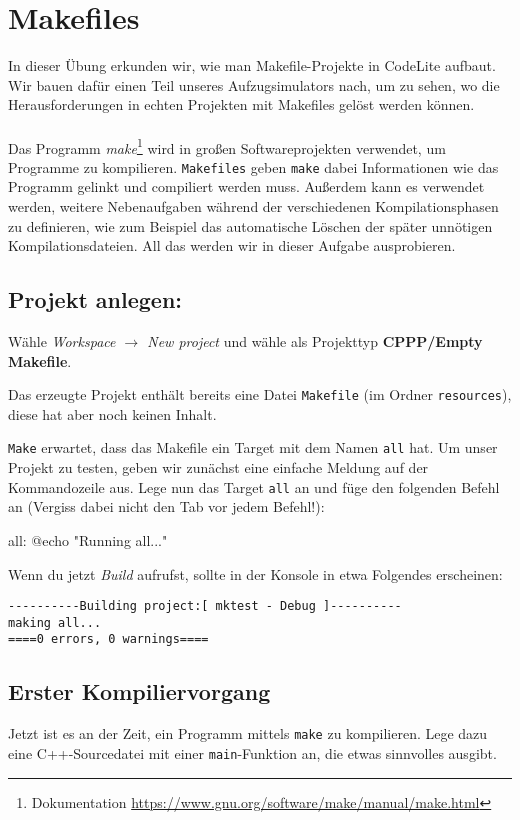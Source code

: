 \section{Makefiles}

In dieser Übung erkunden wir, wie man Makefile-Projekte in CodeLite aufbaut.
Wir bauen dafür einen Teil unseres Aufzugsimulators nach, um zu sehen, wo die Herausforderungen in echten Projekten mit Makefiles gelöst werden können. \\\\

Das Programm \emph{make}\footnote{Dokumentation \url{https://www.gnu.org/software/make/manual/make.html}} wird in großen Softwareprojekten verwendet, um Programme zu kompilieren.
\texttt{Makefiles} geben \texttt{make} dabei Informationen wie das Programm gelinkt und compiliert werden muss.
Außerdem kann es verwendet werden, weitere Nebenaufgaben während der verschiedenen Kompilationsphasen zu definieren, wie zum Beispiel das automatische Löschen der später unnötigen Kompilationsdateien.
All das werden wir in dieser Aufgabe ausprobieren.

\subsection{Projekt anlegen:}
Wähle \emph{Workspace $\to$ New project} und wähle als Projekttyp \textbf{CPPP/Empty Makefile}.

Das erzeugte Projekt enthält bereits eine Datei \texttt{Makefile} (im Ordner \texttt{resources}), diese hat aber noch keinen Inhalt.

\texttt{Make} erwartet, dass das Makefile ein Target mit dem Namen \lstinline{all} hat.
Um unser Projekt zu testen, geben wir zunächst eine einfache Meldung auf der Kommandozeile aus.
Lege nun das Target \lstinline{all} an und füge den folgenden Befehl an (Vergiss dabei nicht den Tab vor jedem Befehl!):
\begin{lstmake}
all:
    @echo "Running all..."
\end{lstmake}

Wenn du jetzt \emph{Build} aufrufst, sollte in der Konsole in etwa Folgendes erscheinen:
\begin{verbatim}
----------Building project:[ mktest - Debug ]----------
making all...
====0 errors, 0 warnings====

\end{verbatim}

\subsection{Erster Kompiliervorgang}
Jetzt ist es an der Zeit, ein Programm mittels \texttt{make} zu kompilieren.
Lege dazu eine C++-Sourcedatei  mit einer \lstinline{main}-Funktion an, die etwas sinnvolles ausgibt.

